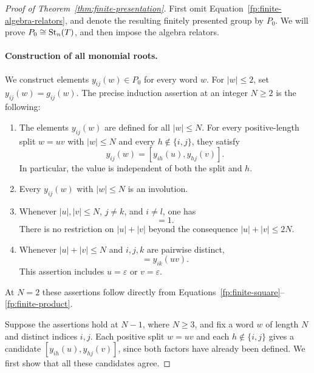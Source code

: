 \begin{proof}[Proof of Theorem~\ref{thm:finite-presentation}]
First omit Equation~\eqref{fp:finite-algebra-relators}, and denote the
resulting finitely presented group by $P_0$.  We will prove
$P_0\cong\operatorname{St}_n(T)$, and then impose the algebra relators.

\paragraph{Construction of all monomial roots.}
We construct elements $y_{ij}(w)\in P_0$ for every word $w$.  For
$|w|\leq2$, set $y_{ij}(w)=g_{ij}(w)$.  The precise induction
assertion at an integer $N\geq2$ is the following:
\begin{enumerate}
 \item The elements $y_{ij}(w)$ are defined for all $|w|\leq N$.
 For every positive-length split $w=uv$ with $|w|\leq N$ and every
 $h\notin\{i,j\}$, they satisfy
 \begin{equation}
  y_{ij}(w)=[y_{ih}(u),y_{hj}(v)].
  \label{fp:positive-split}
 \end{equation}
 In particular, the value is independent of both the split and $h$.
 \item Every $y_{ij}(w)$ with $|w|\leq N$ is an involution.
 \item Whenever $|u|,|v|\leq N$, $j\neq k$, and $i\neq l$, one has
 \begin{equation}
  [y_{ij}(u),y_{kl}(v)]=1.
  \label{fp:all-monomial-commutations}
 \end{equation}
 There is no restriction on $|u|+|v|$ beyond the consequence
 $|u|+|v|\leq2N$.
 \item Whenever $|u|+|v|\leq N$ and $i,j,k$ are pairwise distinct,
 \begin{equation}
  [y_{ij}(u),y_{jk}(v)]=y_{ik}(uv).
  \label{fp:all-monomial-products}
 \end{equation}
 This assertion includes $u=\varepsilon$ or $v=\varepsilon$.
\end{enumerate}
At $N=2$ these assertions follow directly from
Equations~\eqref{fp:finite-square}--\eqref{fp:finite-product}.

Suppose the assertions hold at $N-1$, where $N\geq3$, and fix a word
$w$ of length $N$ and distinct indices $i,j$.  Each positive split
$w=uv$ and each $h\notin\{i,j\}$ gives a candidate
$[y_{ih}(u),y_{hj}(v)]$, since both factors have already been defined.
We first show that all these candidates agree.


\end{proof}
